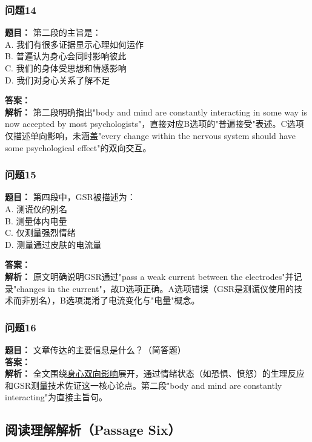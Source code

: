 \documentclass{article}
\begin{document}
\subsubsection*{问题14}
\textbf{题目：} 第二段的主旨是：\\
A. 我们有很多证据显示心理如何运作 \\
B. 普遍认为身心会同时影响彼此 \\
C. 我们的身体受思想和情感影响 \\
D. 我们对身心关系了解不足

\textbf{答案：}  \\
\textbf{解析：} 第二段明确指出"body and mind are constantly interacting in some way is now accepted by most psychologists"，直接对应B选项的"普遍接受"表述。C选项仅描述单向影响，未涵盖"every change within the nervous system should have some psychological effect"的双向交互。

\subsubsection*{问题15}
\textbf{题目：} 第四段中，GSR被描述为：\\
A. 测谎仪的别名 \\
B. 测量体内电量 \\
C. 仅测量强烈情绪 \\
D. 测量通过皮肤的电流量

\textbf{答案：}  \\
\textbf{解析：} 原文明确说明GSR通过"pass a weak current between the electrodes"并记录"changes in the current"，故D选项正确。A选项错误（GSR是测谎仪使用的技术而非别名），B选项混淆了电流变化与"电量"概念。

\subsubsection*{问题16}
\textbf{题目：} 文章传达的主要信息是什么？（简答题）\\
\textbf{答案：}  \\
\textbf{解析：} 全文围绕\underline{身心双向影响}展开，通过情绪状态（如恐惧、愤怒）的生理反应和GSR测量技术佐证这一核心论点。第二段"body and mind are constantly interacting"为直接主旨句。

\subsection*{阅读理解解析（Passage Six）}
\end{document}
